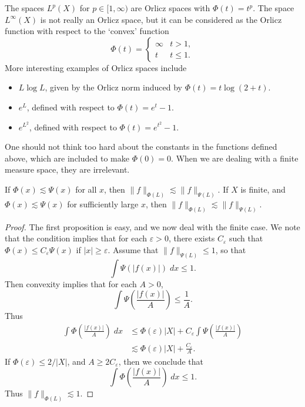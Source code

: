 The spaces $L^p(X)$ for $p \in [1,\infty)$ are Orlicz spaces with $\Phi(t) = t^p$. The space $L^\infty(X)$ is not really an Orlicz space, but it can be considered as the Orlicz function with respect to the `convex' function
%
\[ \Phi(t) = \begin{cases} \infty & t > 1, \\ t & t \leq 1. \end{cases} \]
%
More interesting examples of Orlicz spaces include
%
\begin{itemize}
    \item $L \log L$, given by the Orlicz norm induced by $\Phi(t) = t \log(2 + t)$.
    \item $e^L$, defined with respect to $\Phi(t) = e^t - 1$.
    \item $e^{L^2}$, defined with respect to $\Phi(t) = e^{t^2} - 1$.
\end{itemize}
%
One should not think too hard about the constants in the functions defined above, which are included to make $\Phi(0) = 0$. When we are dealing with a finite measure space, they are irrelevant.

\begin{lemma}
  If $\Phi(x) \lesssim \Psi(x)$ for all $x$, then $\| f \|_{\Phi(L)} \lesssim \| f \|_{\Psi(L)}$. If $X$ is finite, and $\Phi(x) \lesssim \Psi(x)$ for sufficiently large $x$, then $\| f \|_{\Phi(L)} \lesssim \| f \|_{\Psi(L)}$.
\end{lemma}
\begin{proof}
  The first proposition is easy, and we now deal with the finite case. We note that the condition implies that for each $\varepsilon > 0$, there exists $C_\varepsilon$ such that $\Phi(x) \leq C_\varepsilon \Psi(x)$ if $|x| \geq \varepsilon$. Assume that $\| f \|_{\Psi(L)} \leq 1$, so that
  \[ \int \Psi(|f(x)|)\; dx \leq 1. \]
  Then convexity implies that for each $A > 0$,
  \[ \int \Psi \left( \frac{|f(x)|}{A} \right) \leq \frac{1}{A}. \]
  Thus
  \begin{align*}
    \int \Phi\left( \frac{|f(x)|}{A} \right)\; dx &\leq \Phi(\varepsilon) |X| + C_\varepsilon \int \Psi \left( \frac{|f(x)|}{A} \right)\\
    &\lesssim \Phi(\varepsilon) |X| + \frac{C_\varepsilon}{A}.
  \end{align*}
  If $\Phi(\varepsilon) \leq 2/|X|$, and $A \geq 2C_\varepsilon$, then we conclude that
  \[ \int \Phi\left( \frac{|f(x)|}{A} \right)\; dx \leq 1. \]
  Thus $\| f \|_{\Phi(L)} \lesssim 1$.
\end{proof}

